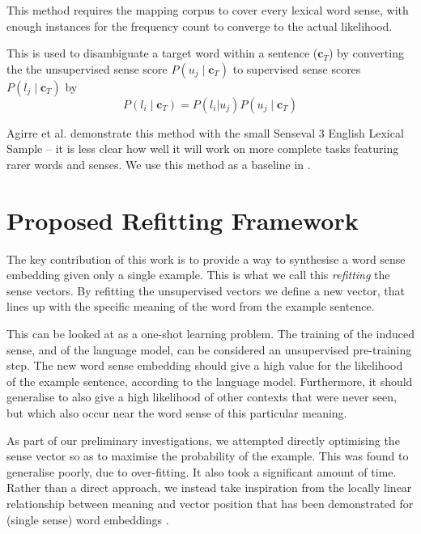 \documentclass{sig-alternate}
\renewcommand{\c}{\mathbf{c}}
\begin{document}
This method requires the mapping corpus to cover every lexical word sense, with enough instances for the frequency count to converge to the actual likelihood.

This is used to disambiguate a target word within a sentence ($\c_T$)  by converting the the unsupervised sense score $P(u_j \mid \c_T)$ to supervised sense scores $P(l_j \mid \c_T)$ by
\begin{equation} \label{eq:agireewsd}
P(l_i \mid \c_T) = P(l_i | u_j) P(u_j \mid \c_T)
\end{equation}


Agirre et al. demonstrate this method with the small Senseval 3 English Lexical Sample \parencite{mihalcea2004senseval} -- it is less clear how well it will work on more complete tasks featuring rarer words and senses. We use this method as a baseline in .


\section{Proposed Refitting Framework} \label{refitting} \label{Framework}

The key contribution of this work is to provide a way to synthesise a word sense embedding given only a single example. This is what we call this \emph{refitting} the sense vectors. By refitting the unsupervised vectors we define a new vector, that lines up with the specific meaning of the word from the example sentence.

This can be looked at as a one-shot learning problem.
The training of the induced sense, and of the language model, can be considered an unsupervised pre-training step. The new word sense embedding should give a high value for the likelihood of the example sentence, according to the language model. Furthermore, it should generalise to also give a high likelihood of other contexts that were never seen, but which also occur near the word sense of this particular meaning.

As part of our preliminary investigations, we attempted directly optimising the sense vector so as to maximise the probability of the example. This was found to generalise poorly, due to over-fitting. It also took a significant amount of time. Rather than a direct approach, we instead take inspiration from the locally linear relationship between meaning and vector position that has been demonstrated for (single sense) word embeddings \parencite{mikolov2013efficient,mikolovSkip,mikolov2013linguisticsubstructures}.
\end{document}
